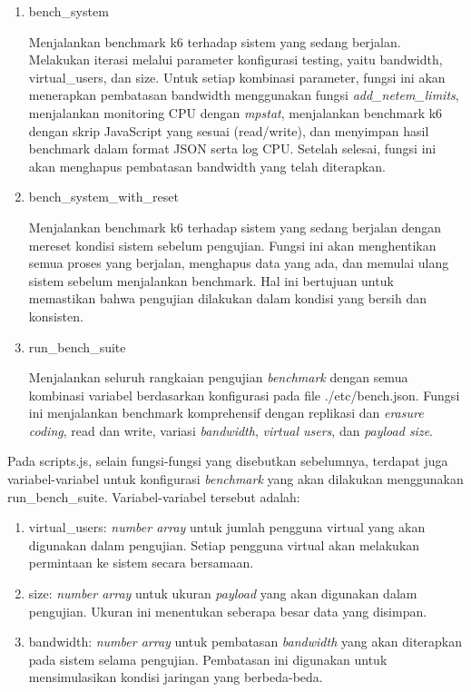 \begin{enumerate}  
  \item bench\_system
  
  Menjalankan benchmark k6 terhadap sistem yang sedang berjalan. Melakukan iterasi melalui parameter konfigurasi testing, yaitu bandwidth, virtual\_users, dan size. Untuk setiap kombinasi parameter, fungsi ini akan menerapkan pembatasan bandwidth menggunakan fungsi \textit{add\_netem\_limits}, menjalankan monitoring CPU dengan \textit{mpstat}, menjalankan benchmark k6 dengan skrip JavaScript yang sesuai (read/write), dan menyimpan hasil benchmark dalam format JSON serta log CPU. Setelah selesai, fungsi ini akan menghapus pembatasan bandwidth yang telah diterapkan.

  \item bench\_system\_with\_reset

  Menjalankan benchmark k6 terhadap sistem yang sedang berjalan dengan mereset kondisi sistem sebelum pengujian. Fungsi ini akan menghentikan semua proses yang berjalan, menghapus data yang ada, dan memulai ulang sistem sebelum menjalankan benchmark. Hal ini bertujuan untuk memastikan bahwa pengujian dilakukan dalam kondisi yang bersih dan konsisten.
  
  \item run\_bench\_suite
  
  Menjalankan seluruh rangkaian pengujian \textit{benchmark} dengan semua kombinasi variabel berdasarkan konfigurasi pada file ./etc/bench.json. Fungsi ini menjalankan benchmark komprehensif dengan replikasi dan \textit{erasure coding}, read dan write, variasi \textit{bandwidth}, \textit{virtual users}, dan \textit{payload size}.
\end{enumerate}

Pada scripts.js, selain fungsi-fungsi yang disebutkan sebelumnya, terdapat juga variabel-variabel untuk konfigurasi \textit{benchmark} yang akan dilakukan menggunakan run\_bench\_suite. Variabel-variabel tersebut adalah:

\begin{enumerate}
  \item virtual\_users: \textit{number array} untuk jumlah pengguna virtual yang akan digunakan dalam pengujian. Setiap pengguna virtual akan melakukan permintaan ke sistem secara bersamaan.
  \item size: \textit{number array} untuk ukuran \textit{payload} yang akan digunakan dalam pengujian. Ukuran ini menentukan seberapa besar data yang disimpan.
  \item bandwidth: \textit{number array} untuk pembatasan \textit{bandwidth} yang akan diterapkan pada sistem selama pengujian. Pembatasan ini digunakan untuk mensimulasikan kondisi jaringan yang berbeda-beda.
\end{enumerate}

